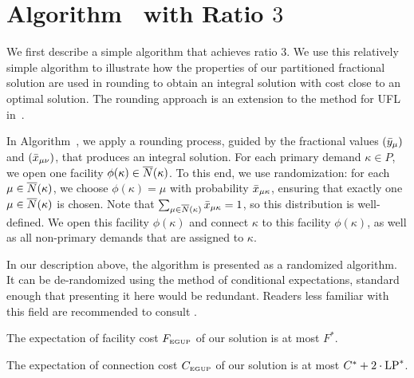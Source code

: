 \documentclass{llncs}
\begin{document}

\section{Algorithm~{\EGUP} with Ratio $3$}
\label{sec: 3-approximation}

We first describe a simple algorithm that achieves ratio $3$. We use
this relatively simple algorithm to illustrate how the properties of
our partitioned fractional solution are used in rounding to obtain an
integral solution with cost close to an optimal solution. The rounding
approach is an extension to the method for UFL in~\cite{gupta08}.

  In Algorithm~{\EGUP}, we apply a
rounding process, guided by the fractional values $({\bar y}_{\mu})$ and
$({\bar x}_{\mu\nu})$, that produces an integral solution.  For each
primary demand $\kappa\in P$, we open one facility $\phi(\kappa) \in
{\overline{N}}(\kappa)$. To this end, we use randomization: for each
$\mu\in{\overline{N}}(\kappa)$, we choose $\phi(\kappa) = \mu$ with
probability ${\bar x}_{\mu\kappa}$, ensuring that exactly one $\mu \in
{\overline{N}}(\kappa)$ is chosen. Note that
$\sum_{\mu\in{\overline{N}}(\kappa)}{\bar x}_{\mu\kappa}=1$, so this distribution
is well-defined.  We open this facility $\phi(\kappa)$ and connect
$\kappa$ to this facility $\phi(\kappa)$, as well as all non-primary
demands that are assigned to $\kappa$.

In our description above, the algorithm is presented as a randomized
algorithm. It can be de-randomized using the method of conditional
expectations, standard enough that presenting it here would be
redundant. Readers less familiar with this field are recommended to
consult \cite{ChudakS04}.


\begin{lemma}\label{lemma:3fac}
  The expectation of facility cost $F_{\mbox{\tiny\rm EGUP}}$ of our solution is
  at most $F^\ast$.
\end{lemma}

\begin{lemma}\label{lemma:3dist}
The expectation of connection cost $C_{\mbox{\tiny\rm EGUP}}$ of our solution
is at most  $C^\ast+2\cdot\mbox{\rm LP}^\ast$.
\end{lemma}
\end{document}
